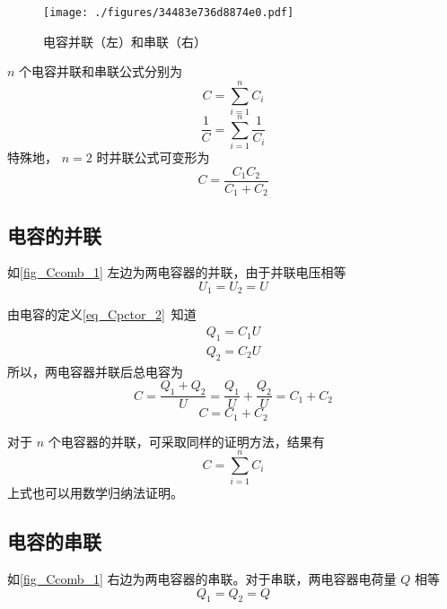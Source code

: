 

\begin{figure}[ht]
\centering
\texttt{[image: ./figures/34483e736d8874e0.pdf]}
\caption{电容并联（左）和串联（右）} \label{fig_Ccomb_1}
\end{figure}

$n$ 个电容并联和串联公式分别为
\begin{equation}
C=\sum_{i=1}^{n}C_i
\end{equation}
\begin{equation}
\frac{1}{C}=\sum_{i=1}^{n}\frac{1}{C_i}
\end{equation}
特殊地， $n = 2$ 时并联公式可变形为
\begin{equation}
C = \frac{C_1 C_2}{C_1 + C_2}
\end{equation}


\subsection{电容的并联}
如\autoref{fig_Ccomb_1} 左边为两电容器的并联，由于并联电压相等
\begin{equation}
U_1=U_2=U
\end{equation}

由电容的定义\autoref{eq_Cpctor_2}~知道
\begin{equation}
\begin{aligned}
Q_1=C_1U\\
Q_2=C_2U
\end{aligned}
\end{equation}
所以，两电容器并联后总电容为
\begin{equation}
C=\frac{Q_1+Q_2}{U}=\frac{Q_1}{U}+\frac{Q_2}{U}=C_1+C_2
\end{equation}
\begin{equation}
C = C_1 + C_2
\end{equation}

对于 $n$ 个电容器的并联，可采取同样的证明方法，结果有
\begin{equation}
C=\sum_{i=1}^{n}C_i
\end{equation}
上式也可以用数学归纳法证明。

\subsection{电容的串联}
如\autoref{fig_Ccomb_1} 右边为两电容器的串联。对于串联，两电容器电荷量 $Q$ 相等
\begin{equation}
Q_1=Q_2=Q
\end{equation}

